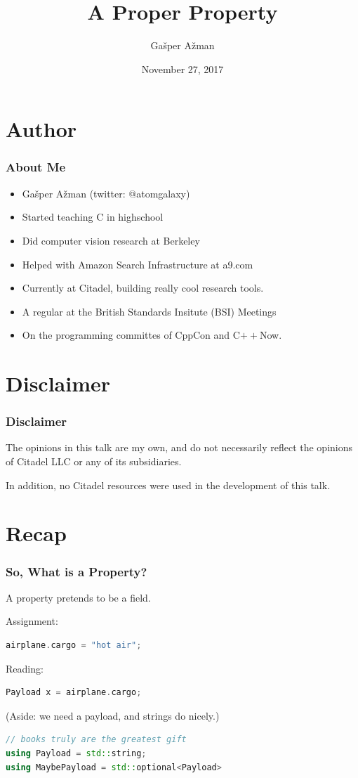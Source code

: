 \documentclass{beamer}
\title{A Proper Property}
\author{Gašper Ažman}
\date{November 27, 2017}
\newcommand{\CC}{C\nolinebreak\hspace{-.05em}\raisebox{0.4ex}{\resizebox{!}{0.6\baselineskip}{\bf++}}}
\newcommand{\cplusplus}{\protect\CC\xspace}
\newcommand{\nl}{\vspace{0.2\baselineskip}}
\begin{document}
\begin{frame}
  \titlepage
\end{frame}


\section{Author}
\begin{frame}
  \frametitle{About Me}
  \begin{itemize}
    \item Gašper Ažman (twitter: @atomgalaxy)
    \item Started teaching \cplusplus in highschool
    \item Did computer vision research at Berkeley
    \item Helped with Amazon Search Infrastructure at a9.com
    \item Currently at Citadel, building really cool research tools.
    \item A regular at the British Standards Insitute (BSI) Meetings
    \item On the programming committes of CppCon and C$++$Now.
  \end{itemize}
\end{frame}

\section{Disclaimer}

\begin{frame}
\frametitle{Disclaimer}
The opinions in this talk are my own, and do not necessarily reflect the
opinions of Citadel LLC or any of its subsidiaries.\nl

In addition, no Citadel resources were used in the development of this talk.
\end{frame}


\section{Recap}
\begin{frame}[fragile]

\frametitle{So, What is a Property?}
\begin{center}
{\Large A property pretends to be a field.}
\end{center}

Assignment:
\begin{lstlisting}[language=cpp]
airplane.cargo = "hot air";
\end{lstlisting}

Reading:
\begin{lstlisting}[language=cpp]
Payload x = airplane.cargo;
\end{lstlisting}

(Aside: we need a payload, and strings do nicely.)
\begin{lstlisting}[language=cpp]
// books truly are the greatest gift
using Payload = std::string;
using MaybePayload = std::optional<Payload>
\end{lstlisting}

\end{frame}
\end{document}

